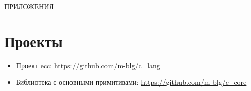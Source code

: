\newcommand{\nocontentsline}[3]{}
\begingroup
\let\clearpage\relax
\renewcommand{\addcontentsline}[3]{\nocontentsline{#1}{#2}{#3}}
\begin{center}
ПРИЛОЖЕНИЯ
\end{center}

\chapter{Проекты}
\endgroup

\addcontentsline{toc}{chapter}{ПРИЛОЖЕНИЯ} 


\begin{itemize}
\item\label{extras:ecc} Проект ecc: \url{https://github.com/m-blg/c_lang}

\item\label{extras:c-core} Библиотека с основными примитивами: \url{https://github.com/m-blg/c_core}
\end{itemize}










\pagestyle{appendixpage}


